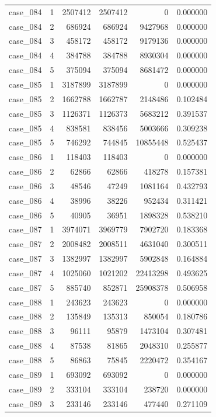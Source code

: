\begin{longtable}{lrrrrr}
case\_084 & 1 & 2507412 & 2507412 & 0 & 0.000000 \\
case\_084 & 2 & 686924 & 686924 & 9427968 & 0.000000 \\
case\_084 & 3 & 458172 & 458172 & 9179136 & 0.000000 \\
case\_084 & 4 & 384788 & 384788 & 8930304 & 0.000000 \\
case\_084 & 5 & 375094 & 375094 & 8681472 & 0.000000 \\
case\_085 & 1 & 3187899 & 3187899 & 0 & 0.000000 \\
case\_085 & 2 & 1662788 & 1662787 & 2148486 & 0.102484 \\
case\_085 & 3 & 1126371 & 1126373 & 5683212 & 0.391537 \\
case\_085 & 4 & 838581 & 838456 & 5003666 & 0.309238 \\
case\_085 & 5 & 746292 & 744845 & 10855448 & 0.525437 \\
case\_086 & 1 & 118403 & 118403 & 0 & 0.000000 \\
case\_086 & 2 & 62866 & 62866 & 418278 & 0.157381 \\
case\_086 & 3 & 48546 & 47249 & 1081164 & 0.432793 \\
case\_086 & 4 & 38996 & 38226 & 952434 & 0.311421 \\
case\_086 & 5 & 40905 & 36951 & 1898328 & 0.538210 \\
case\_087 & 1 & 3974071 & 3969779 & 7902720 & 0.183368 \\
case\_087 & 2 & 2008482 & 2008511 & 4631040 & 0.300511 \\
case\_087 & 3 & 1382997 & 1382997 & 5902848 & 0.164884 \\
case\_087 & 4 & 1025060 & 1021202 & 22413298 & 0.493625 \\
case\_087 & 5 & 885740 & 852871 & 25908378 & 0.506958 \\
case\_088 & 1 & 243623 & 243623 & 0 & 0.000000 \\
case\_088 & 2 & 135849 & 135313 & 850054 & 0.180786 \\
case\_088 & 3 & 96111 & 95879 & 1473104 & 0.307481 \\
case\_088 & 4 & 87538 & 81865 & 2048310 & 0.255877 \\
case\_088 & 5 & 86863 & 75845 & 2220472 & 0.354167 \\
case\_089 & 1 & 693092 & 693092 & 0 & 0.000000 \\
case\_089 & 2 & 333104 & 333104 & 238720 & 0.000000 \\
case\_089 & 3 & 233146 & 233146 & 477440 & 0.271109 \\

\end{longtable}
